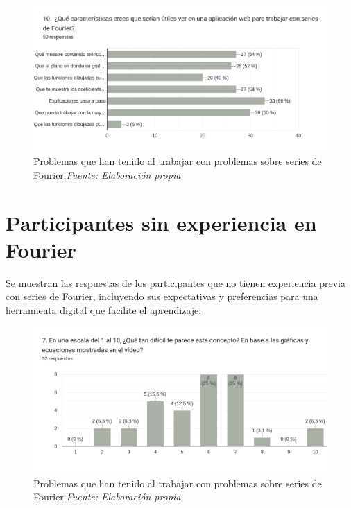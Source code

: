 \begin{figure}[H]
	\centering
	\includegraphics[width=1\textwidth]{img/appendixA/10_cosas_utiles_App_Fourier.png}
	\caption[Problemas que han tenido al trabajar con problemas sobre series de Fourier.]{Problemas que han tenido al trabajar con problemas sobre series de Fourier.\textit{Fuente: Elaboración propia}}
	\label{fig:app1_cosas_utiles_App_Fourier}  %
\end{figure}

\newpage
\section{Participantes sin experiencia en Fourier}
Se muestran las respuestas de los participantes que no tienen experiencia previa con series de Fourier, incluyendo sus expectativas y preferencias para una herramienta digital que facilite el aprendizaje.

\begin{figure}[H]
	\centering
	\includegraphics[width=1\textwidth]{img/appendixA/7_dificultad_video_Foruier.png}
	\caption[Problemas que han tenido al trabajar con problemas sobre series de Fourier.]{Problemas que han tenido al trabajar con problemas sobre series de Fourier.\textit{Fuente: Elaboración propia}}
	\label{fig:app1_dificultad_video_Foruier}  %
\end{figure}

